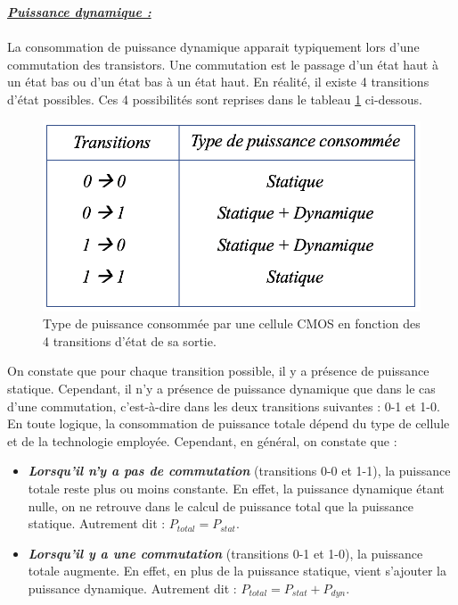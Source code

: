 \documentclass[10pt, oneside, a4paper]{article}
\begin{document}
\hspace{-0.5 cm}

\underline{\textbf{\textit{Puissance dynamique :}}} \\ \\
La consommation de puissance dynamique apparait typiquement lors d'une commutation des transistors. Une commutation est le passage d'un état haut à un état bas ou d'un état bas à un état haut. En réalité, il existe 4 transitions d'état possibles. Ces 4 possibilités sont reprises dans le tableau \ref{fig:dyn} ci-dessous. 
\begin{figure}[htbp]
    \centering
    \includegraphics[scale=0.4]{image/dyn}
    \caption{Type de puissance consommée par une cellule CMOS en fonction des 4 transitions d'état de sa sortie.}
    \label{fig:dyn} 
\end{figure}

\hspace{-0.5 cm}On constate que pour chaque transition possible, il y a présence de puissance statique. Cependant, il n'y a présence de puissance dynamique que dans le cas d'une commutation, c'est-à-dire dans les deux transitions suivantes : 0-1 et 1-0.  En toute logique, la consommation de puissance totale dépend du type de cellule et de la technologie employée. Cependant, en général, on constate que : 
\begin{itemize}
\item \textbf{\textit{Lorsqu'il n'y a pas de commutation}} (transitions 0-0 et 1-1), la puissance totale reste plus ou moins constante. En effet, la puissance dynamique étant nulle, on ne retrouve dans le calcul de puissance total que la puissance statique. Autrement dit : $P_{total}=P_{stat}$.
\item \textbf{\textit{Lorsqu'il y a une commutation}} (transitions 0-1 et 1-0), la puissance totale augmente. En effet, en plus de la puissance statique, vient s'ajouter la puissance dynamique. Autrement dit : $P_{total}=P_{stat}+P_{dyn}$.
\end{itemize}
\end{document}

